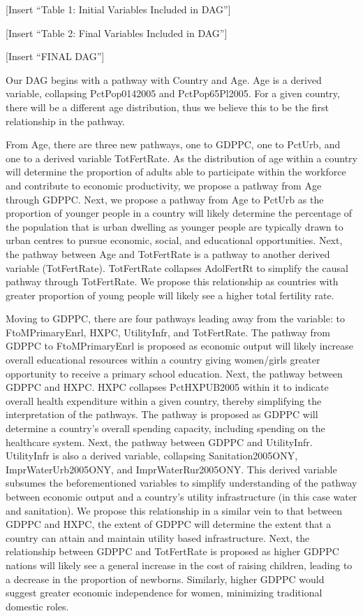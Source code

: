 \documentclass[
]{article}
\begin{document}
{[}Insert ``Table 1: Initial Variables Included in DAG''{]}

{[}Insert ``Table 2: Final Variables Included in DAG''{]}

{[}Insert ``FINAL DAG''{]}

Our DAG begins with a pathway with Country and Age. Age is a derived
variable, collapsing PctPop0142005 and PctPop65Pl2005. For a given
country, there will be a different age distribution, thus we believe
this to be the first relationship in the pathway.

From Age, there are three new pathways, one to GDPPC, one to PctUrb, and
one to a derived variable TotFertRate. As the distribution of age within
a country will determine the proportion of adults able to participate
within the workforce and contribute to economic productivity, we propose
a pathway from Age through GDPPC. Next, we propose a pathway from Age to
PctUrb as the proportion of younger people in a country will likely
determine the percentage of the population that is urban dwelling as
younger people are typically drawn to urban centres to pursue economic,
social, and educational opportunities. Next, the pathway between Age and
TotFertRate is a pathway to another derived variable (TotFertRate).
TotFertRate collapses AdolFertRt to simplify the causal pathway through
TotFertRate. We propose this relationship as countries with greater
proportion of young people will likely see a higher total fertility
rate.

Moving to GDPPC, there are four pathways leading away from the variable:
to FtoMPrimaryEnrl, HXPC, UtilityInfr, and TotFertRate. The pathway from
GDPPC to FtoMPrimaryEnrl is proposed as economic output will likely
increase overall educational resources within a country giving
women/girls greater opportunity to receive a primary school education.
Next, the pathway between GDPPC and HXPC. HXPC collapses PctHXPUB2005
within it to indicate overall health expenditure within a given country,
thereby simplifying the interpretation of the pathways. The pathway is
proposed as GDPPC will determine a country's overall spending capacity,
including spending on the healthcare system. Next, the pathway between
GDPPC and UtilityInfr. UtilityInfr is also a derived variable,
collapsing Sanitation2005ONY, ImprWaterUrb2005ONY, and
ImprWaterRur2005ONY. This derived variable subsumes the beforementioned
variables to simplify understanding of the pathway between economic
output and a country's utility infrastructure (in this case water and
sanitation). We propose this relationship in a similar vein to that
between GDPPC and HXPC, the extent of GDPPC will determine the extent
that a country can attain and maintain utility based infrastructure.
Next, the relationship between GDPPC and TotFertRate is proposed as
higher GDPPC nations will likely see a general increase in the cost of
raising children, leading to a decrease in the proportion of newborns.
Similarly, higher GDPPC would suggest greater economic independence for
women, minimizing traditional domestic roles.
\end{document}
